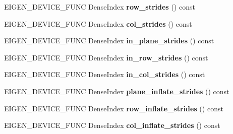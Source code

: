 \begin{DoxyCompactItemize}
E\+I\+G\+E\+N\+\_\+\+D\+E\+V\+I\+C\+E\+\_\+\+F\+U\+NC Dense\+Index {\bfseries row\+\_\+strides} () const
\item 
\mbox{\label{class_eigen_1_1_tensor_volume_patch_op_a3d36f431162ace90c6fd88c2c099d6eb}} 
E\+I\+G\+E\+N\+\_\+\+D\+E\+V\+I\+C\+E\+\_\+\+F\+U\+NC Dense\+Index {\bfseries col\+\_\+strides} () const
\item 
\mbox{\label{class_eigen_1_1_tensor_volume_patch_op_a7649aeb8e06d893f3a89f444882b6ccc}} 
E\+I\+G\+E\+N\+\_\+\+D\+E\+V\+I\+C\+E\+\_\+\+F\+U\+NC Dense\+Index {\bfseries in\+\_\+plane\+\_\+strides} () const
\item 
\mbox{\label{class_eigen_1_1_tensor_volume_patch_op_a09e2dca0c18334d9c680291d55d0215f}} 
E\+I\+G\+E\+N\+\_\+\+D\+E\+V\+I\+C\+E\+\_\+\+F\+U\+NC Dense\+Index {\bfseries in\+\_\+row\+\_\+strides} () const
\item 
\mbox{\label{class_eigen_1_1_tensor_volume_patch_op_acf7081fc28c88e5444c0264b721d4001}} 
E\+I\+G\+E\+N\+\_\+\+D\+E\+V\+I\+C\+E\+\_\+\+F\+U\+NC Dense\+Index {\bfseries in\+\_\+col\+\_\+strides} () const
\item 
\mbox{\label{class_eigen_1_1_tensor_volume_patch_op_a35a464b0b9c41b02233235ed6c83ff3f}} 
E\+I\+G\+E\+N\+\_\+\+D\+E\+V\+I\+C\+E\+\_\+\+F\+U\+NC Dense\+Index {\bfseries plane\+\_\+inflate\+\_\+strides} () const
\item 
\mbox{\label{class_eigen_1_1_tensor_volume_patch_op_a7ec8a659e3a9df305a5e883cb99eb4cd}} 
E\+I\+G\+E\+N\+\_\+\+D\+E\+V\+I\+C\+E\+\_\+\+F\+U\+NC Dense\+Index {\bfseries row\+\_\+inflate\+\_\+strides} () const
\item 
\mbox{\label{class_eigen_1_1_tensor_volume_patch_op_ae4689d47bf6784443f60f14ddff059a4}} 
E\+I\+G\+E\+N\+\_\+\+D\+E\+V\+I\+C\+E\+\_\+\+F\+U\+NC Dense\+Index {\bfseries col\+\_\+inflate\+\_\+strides} () const
\item 
\mbox{\label{class_eigen_1_1_tensor_volume_patch_op_a82cd679f27fe48e3f69749ff05f9a6cb}} 

\end{DoxyCompactItemize}
